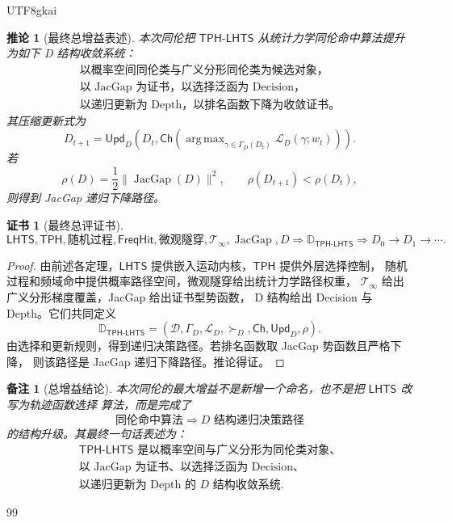 \documentclass[12pt]{article}
\newtheorem{corollary}{推论}[section]
\newtheorem{remark}{备注}[section]
\newtheorem{Certificate}{证书}[section]
\newcommand{\LHTS}{\ensuremath{\mathsf{LHTS}}}
\newcommand{\TPH}{\ensuremath{\mathsf{TPH}}}
\newcommand{\TPHLHTS}{\ensuremath{\mathsf{TPH\mbox{-}LHTS}}}
\newcommand{\FreqHit}{\ensuremath{\mathsf{FreqHit}}}
\DeclareMathOperator{\JacGap}{JacGap}
\DeclareMathOperator*{\argmax}{arg\,max}
\begin{document}
\begin{CJK*}{UTF8}{gkai}
\begin{corollary}[最终总增益表述]
本次同伦把 \(\TPHLHTS\) 从统计力学同伦命中算法提升为如下 D 结构收敛系统：
\[
\boxed{
\begin{gathered}
\text{以概率空间同伦类与广义分形同伦类为候选对象，}
\\
\text{以 JacGap 为证书，以选择泛函为 Decision，}
\\
\text{以递归更新为 Depth，以排名函数下降为收敛证书。}
\end{gathered}
}
\]
其压缩更新式为
\[
\boxed{
D_{t+1}
=
\mathsf{Upd}_D
\left(
D_t,
\mathsf{Ch}
\left(
\argmax_{\gamma\in\Gamma_D(D_t)}
\mathcal L_D(\gamma;w_t)
\right)
\right).
}
\]
若
\[
\rho(D)
=
\frac12\|\JacGap(D)\|^2,
\qquad
\rho(D_{t+1})<\rho(D_t),
\]
则得到 JacGap 递归下降路径。
\end{corollary}

\begin{Certificate}[最终总评证书]
\[
\boxed{
\LHTS,\TPH,\text{随机过程},\FreqHit,
\text{微观隧穿},\mathcal T_\infty,\JacGap,D
\Rightarrow
\mathbb D_{\TPHLHTS}
\Rightarrow
D_0\to D_1\to\cdots.
}
\]
\end{Certificate}

\begin{proof}
由前述各定理，\(\LHTS\) 提供嵌入运动内核，\(\TPH\) 提供外层选择控制，
随机过程和频域命中提供概率路径空间，微观隧穿给出统计力学路径权重，
\(\mathcal T_\infty\) 给出广义分形梯度覆盖，JacGap 给出证书型势函数，
D 结构给出 Decision 与 Depth。它们共同定义
\[
\mathbb D_{\TPHLHTS}
=
\left(
\mathcal D,
\Gamma_D,
\mathcal L_D,
\succ_D,
\mathsf{Ch},
\mathsf{Upd}_D,
\rho
\right).
\]
由选择和更新规则，得到递归决策路径。若排名函数取 JacGap 势函数且严格下降，
则该路径是 JacGap 递归下降路径。推论得证。
\end{proof}

\begin{remark}[总增益结论]
本次同伦的最大增益不是新增一个命名，也不是把 \(\LHTS\) 改写为轨迹函数选择
算法，而是完成了
\[
\boxed{
\text{同伦命中算法}
\Longrightarrow
D\text{ 结构递归决策路径}
}
\]
的结构升级。其最终一句话表述为：
\[
\boxed{
\begin{gathered}
\TPHLHTS
\text{ 是以概率空间与广义分形为同伦类对象、}
\\
\text{以 JacGap 为证书、以选择泛函为 Decision、}
\\
\text{以递归更新为 Depth 的 }D\text{ 结构收敛系统}.
\end{gathered}
}
\]
\end{remark}

\begin{thebibliography}{99}
\raggedright


\end{thebibliography}
\end{CJK*}
\end{document}
